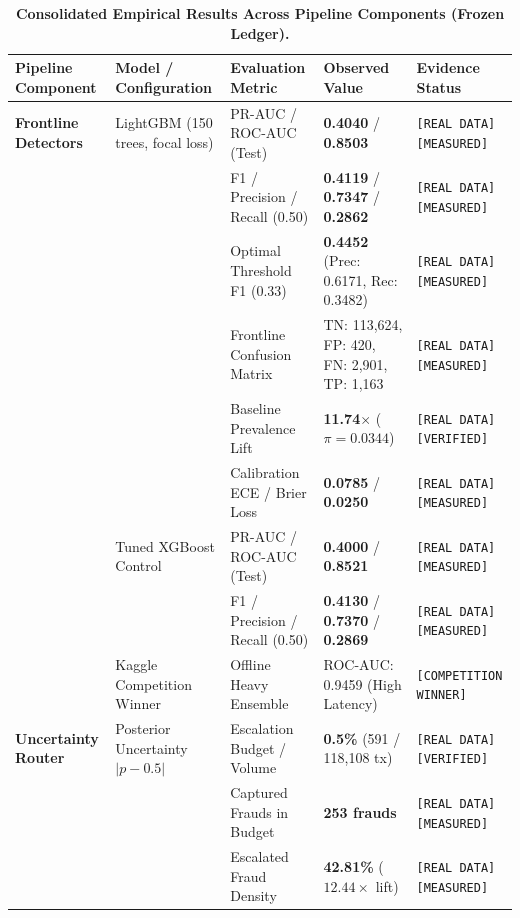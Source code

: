 \documentclass[10pt,a4paper]{article}
\begin{document}
\vspace{-2pt}
\begin{table}[h!]
\centering
\scriptsize
\renewcommand{\arraystretch}{0.72}
\caption{\textbf{Consolidated Empirical Results Across Pipeline Components (Frozen Ledger).}}
\label{tab:results}
\vspace{1pt}
\begin{tabularx}{\linewidth}{@{}p{2.3cm}Xp{2.7cm}p{2.1cm}>{\raggedright\arraybackslash\tiny}p{2.1cm}@{}}
\toprule
\textbf{Pipeline Component} & \textbf{Model / Configuration} & \textbf{Evaluation Metric} & \textbf{Observed Value} & \textbf{Evidence Status} \\
\midrule
\textbf{Frontline Detectors} & LightGBM (150 trees, focal loss) & PR-AUC / ROC-AUC (Test) & \textbf{0.4040} / \textbf{0.8503} & \texttt{[REAL DATA][MEASURED]} \\
& & F1 / Precision / Recall (0.50) & \textbf{0.4119} / \textbf{0.7347} / \textbf{0.2862} & \texttt{[REAL DATA][MEASURED]} \\
& & Optimal Threshold F1 (0.33) & \textbf{0.4452} (Prec: 0.6171, Rec: 0.3482) & \texttt{[REAL DATA][MEASURED]} \\
& & Frontline Confusion Matrix & TN: 113,624, FP: 420, FN: 2,901, TP: 1,163 & \texttt{[REAL DATA][MEASURED]} \\
& & Baseline Prevalence Lift & \textbf{11.74$\times$} ($\pi=0.0344$) & \texttt{[REAL DATA][VERIFIED]} \\
& & Calibration ECE / Brier Loss & \textbf{0.0785} / \textbf{0.0250} & \texttt{[REAL DATA][MEASURED]} \\
& Tuned XGBoost Control & PR-AUC / ROC-AUC (Test) & \textbf{0.4000} / \textbf{0.8521} & \texttt{[REAL DATA][MEASURED]} \\
& & F1 / Precision / Recall (0.50) & \textbf{0.4130} / \textbf{0.7370} / \textbf{0.2869} & \texttt{[REAL DATA][MEASURED]} \\
& Kaggle Competition Winner & Offline Heavy Ensemble & ROC-AUC: 0.9459 (High Latency) & \texttt{[COMPETITION WINNER]} \\
\midrule
\textbf{Uncertainty Router} & Posterior Uncertainty $|p-0.5|$ & Escalation Budget / Volume & \textbf{0.5\%} (591 / 118,108 tx) & \texttt{[REAL DATA][VERIFIED]} \\
& & Captured Frauds in Budget & \textbf{253 frauds} & \texttt{[REAL DATA][MEASURED]} \\
& & Escalated Fraud Density & \textbf{42.81\%} ($12.44\times$ lift) & \texttt{[REAL DATA][MEASURED]} \\

\end{tabularx}
\end{table}
\end{document}
